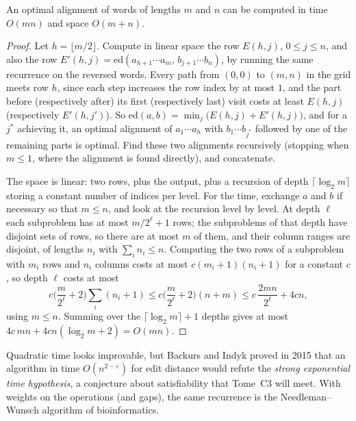 \begin{theorem}[Hirschberg, 1975]\label{thm:hirschberg}
An optimal alignment of words of lengths $m$ and $n$ can be computed in time $O(mn)$ and space $O(m+n)$.
\end{theorem}
\begin{proof}
Let $h=\lfloor m/2\rfloor$. Compute in linear space the row $E(h,j)$, $0\le j\le n$, and also the row $E'(h,j)=\mathrm{ed}(a_{h+1}\cdots a_m,\,b_{j+1}\cdots b_n)$, by running the same recurrence on the reversed words.
Every path from $(0,0)$ to $(m,n)$ in the grid meets row $h$, since each step increases the row index by at most $1$, and the part before (respectively after) its first (respectively last) visit costs at least $E(h,j)$
(respectively $E'(h,j')$). So $\mathrm{ed}(a,b)=\min_j\big(E(h,j)+E'(h,j)\big)$, and for a $j^*$ achieving it, an optimal alignment of $a_1\cdots a_h$ with $b_1\cdots b_{j^*}$ followed by one of the remaining parts is optimal. Find
these two alignments recursively (stopping when $m\le1$, where the alignment is found directly), and concatenate.

The space is linear: two rows, plus the output, plus a recursion of depth $\lceil\log_2m\rceil$ storing a constant number of indices per level. For the time, exchange $a$ and $b$ if necessary so that $m\le n$,
and look at the recursion level by level. At depth $\ell$ each subproblem has at most $m/2^\ell+1$ rows; the subproblems of that depth have disjoint sets of rows, so there are at most $m$ of them, and their column ranges
are disjoint, of lengths $n_i$ with $\sum_in_i\le n$. Computing the two rows of a subproblem with $m_i$ rows and $n_i$ columns costs at most $c(m_i+1)(n_i+1)$ for a constant $c$, so depth $\ell$ costs at most
\[
c\Big(\frac m{2^\ell}+2\Big)\sum_i(n_i+1)\le c\Big(\frac m{2^\ell}+2\Big)(n+m)\le c\,\frac{2mn}{2^\ell}+4cn,
\]
using $m\le n$. Summing over the $\lceil\log_2m\rceil+1$ depths gives at most $4c\,mn+4cn(\log_2m+2)=O(mn)$.
\end{proof}

\begin{remark}
Quadratic time looks improvable, but Backurs and Indyk proved in 2015 that an algorithm in time $O(n^{2-\varepsilon})$ for edit distance would refute the \emph{strong exponential time hypothesis}, a
conjecture about satisfiability that Tome~C3 will meet. With weights on the operations (and gaps), the same recurrence is the Needleman--Wunsch algorithm of bioinformatics.
\end{remark}

